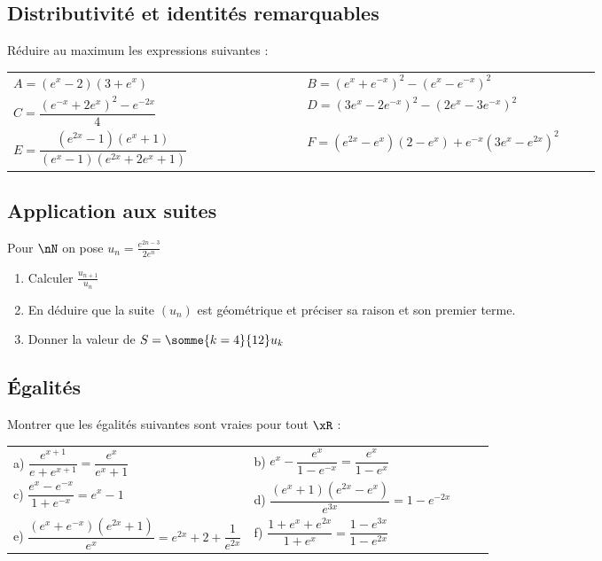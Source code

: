 \documentclass[oneside,12pt]{book}          %
\begin{document}
\subsection{Distributivité et identités remarquables}
Réduire au maximum les expressions suivantes :

\renewcommand{\arraystretch}{2.3}
\begin{tabular}{p{0.45\linewidth} p{0.45\linewidth}}
    $A = \left(e^x-2\right)\left(3+e^x\right)$ & $B = \left(e^x+e^{-x}\right)^2-\left(e^x-e^{-x}\right)^2$\\
    $C = \dfrac{\left(e^{-x}+2e^x\right)^2-e^{-2x}}{4}$\ & $D = \left(3e^x-2e^{-x}\right)^2-\left(2e^x-3e^{-x}\right)^2$\\
    $E = \dfrac{\left(e^{2x}-1\right)\left(e^x+1\right)}{\left(e^x-1\right)\left(e^{2x}+2e^x+1\right)}$ & $F = \left(e^{2x}-e^x\right)\left(2-e^x\right)+e^{-x}\left(3e^x-e^{2x}\right)^2$
\end{tabular}



\subsection{Application aux suites}
Pour $\nN$ on pose $u_n=\frac{e^{2n-3}}{2e^n}$
\begin{enumerate}
    \item Calculer $\frac{u_{n+1}}{u_n}$
    \item En déduire que la suite $(u_n)$ est géométrique et préciser sa raison et son premier terme.
    \item Donner la valeur de $S=\somme{k=4}{12}u_k$
\end{enumerate}



\subsection{Égalités}
Montrer que les égalités suivantes sont vraies pour tout $\xR$ :

\renewcommand{\arraystretch}{2.4}
\begin{tabular}{p{0.5\linewidth} p{0.5\linewidth}}\large
    a) $\dfrac{e^{x+1}}{e+e^{x+1}}=\dfrac{e^x}{e^x+1}$ &
    b) $e^x-\dfrac{e^x}{1-e^{-x}}=\dfrac{e^x}{1-e^x}$ \\
    c) $\dfrac{e^x-e^{-x}}{1+e^{-x}}=e^x-1$ &
    d) $\dfrac{(e^{x}+1)(e^{2x}-e^x)}{e^{3x}}=1-e^{-2x} $\\
    e) $\dfrac{(e^{x}+e^{-x})(e^{2x}+1)}{e^{x}}=e^{2x}+2+\dfrac{1}{e^{2x}}$ &
    f) $\dfrac{1+e^{x}+e^{2x}}{1+e^{x}}=\dfrac{1-e^{3x}}{1-e^{2x}}$
\end{tabular}
\end{document}
